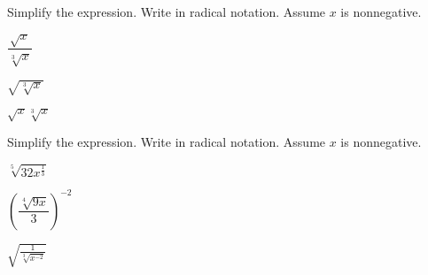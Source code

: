 \begin{exercise}Simplify the expression. Write  in radical notation.  Assume $x$ is nonnegative. \\
	\begin{enumerate*}[label={(\arabic*)~}]
		\item $\dfrac{\sqrt{x}}{\sqrt[3]{x}}$
		\item $\sqrt{\sqrt[3]{x}}$
		\item $\sqrt{x}\sqrt[3]{x}$\hfill\null
	\end{enumerate*}
\end{exercise}

\vfill
\begin{center} \hfill
	\raisebox{0.4em}{
		\rotatebox{\rotationdegree}{
			\parbox{\textwidth}{
				\begin{enumerate*}[label={\theexer~(\arabic*)~}]
					\item $\sqrt[6]{x}$
					\item $\sqrt[6]{x}$
					\item $\sqrt[6]{x^5}$
					\hfill\null
				\end{enumerate*}
			}
		}
	}
\end{center}

\newpage

\begin{exercise}Simplify the expression. Write in radical notation. Assume $x$ is nonnegative. \\
	\begin{enumerate*}[label={(\arabic*)~}]
		\item $\sqrt[5]{32x^{\frac13}}$
		\item $\left(\dfrac{\sqrt[4]{9x}}{3}\right)^{-2}$
		\item $\sqrt{\frac{1}{\sqrt[3]{x^{-2}}}}$
		\hfill\null
	\end{enumerate*}
\end{exercise}

\vfill
\begin{center} \hfill
	\raisebox{0.4em}{
		\rotatebox{\rotationdegree}{
			\parbox{\textwidth}{
				\begin{enumerate*}[label={\theexer~(\arabic*)~}]
					\item $2\sqrt[15]{x}$
					\item $\frac{3}{\sqrt{x}}$
					\item $\sqrt[3]{x}$
					\hfill\null
				\end{enumerate*}
			}
		}
	}
\end{center}

